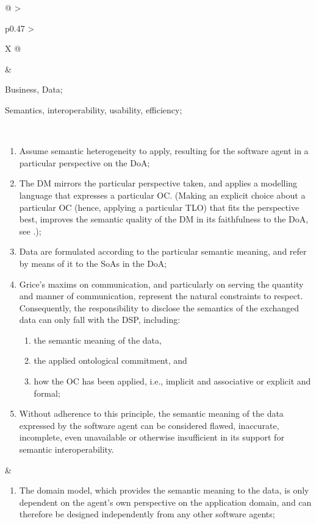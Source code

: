 \begin{xltabular}[l]{\linewidth}{@{} >{\small\raggedright\arraybackslash}p{0.47\linewidth} >{\small\raggedright\arraybackslash}X @{}}
\begin{mmdp}
\end{mmdp}
&
\begin{description}[labelwidth=3.7cm,leftmargin=3.7cm+1ex,nosep,topsep=2ex,labelsep=1ex,font=\bfseries]
  \item[Type of information:] Business, Data;
  \item[Quality attributes:] Semantics, interoperability, usability, efficiency;
\end{description} \\
\begin{enumerate}[left=6pt, nosep]
  \item Assume semantic heterogeneity to apply, resulting for the software agent in a particular perspective on the DoA;
  \item The DM mirrors the particular perspective taken, and applies a modelling language that expresses a particular OC. (Making an explicit choice about a particular OC (hence, applying a particular TLO) that fits the perspective best, improves the semantic quality of the DM in its faithfulness to the DoA, see \cite[DP6]{Brandt2021a}.); 
  \item Data are formulated according to the particular semantic meaning, and refer by means of it to the SoAs in the DoA;
  \item Grice’s maxims on communication, and particularly on serving the quantity and manner of communication, represent the natural constraints to respect. Consequently, the responsibility to disclose the semantics of the exchanged data can only fall with the DSP, including:
  \begin{enumerate}
    \item the semantic meaning of the data,
    \item the applied ontological commitment, and
    \item how the OC has been applied, i.e., implicit and associative or explicit and formal;
  \end{enumerate}
  \item Without adherence to this principle, the semantic meaning of the data expressed by the software agent can be considered flawed, inaccurate, incomplete, even unavailable or otherwise insufficient in its support for semantic interoperability.
\end{enumerate}
&
\begin{enumerate}[left=10pt, nosep]
  \item The domain model, which provides the semantic meaning to the data, is only dependent on the agent's own perspective on the application domain, and can therefore be designed independently from any other software agents;

\end{enumerate}
\end{xltabular}
